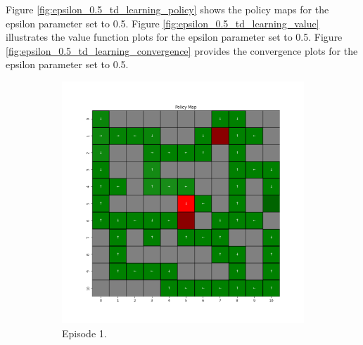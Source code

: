 \documentclass{assignment}
\begin{document}
Figure \ref{fig:epsilon_0.5_td_learning_policy} shows the policy maps for the epsilon parameter set to 0.5.     Figure \ref{fig:epsilon_0.5_td_learning_value} illustrates the value function plots for the epsilon parameter set to 0.5. Figure \ref{fig:epsilon_0.5_td_learning_convergence} provides the convergence plots for the epsilon parameter set to 0.5.

\begin{figure}[H]
    \begin{subfigure}{0.3\textwidth}
        \includegraphics[width=\textwidth]{figures/policy_td/epsilon_sweep/policy_alpha_0.1_gamma_0.95_epsilon_0.5_iteration_1.png}
    \caption{Episode 1.}
    \end{subfigure}\hfill
    \begin{subfigure}{0.3\textwidth}

\end{subfigure}
\end{figure}
\end{document}
